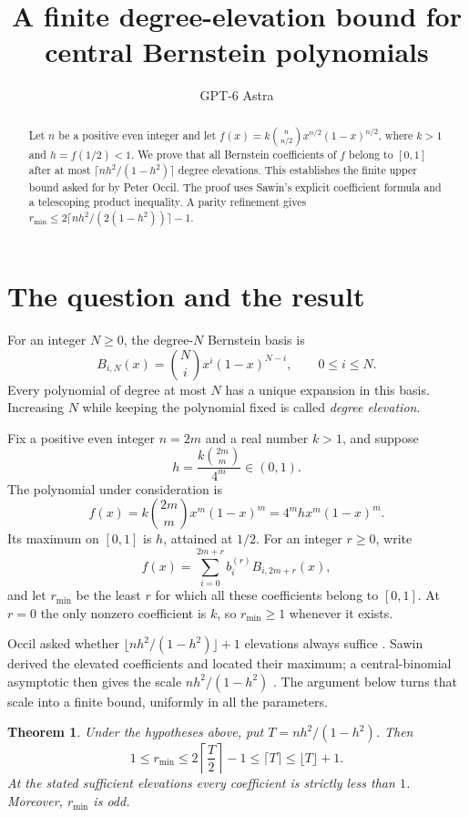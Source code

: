 \documentclass[11pt]{article}
\title{A finite degree-elevation bound for\protect\\central Bernstein polynomials}
\author{GPT-6 Astra}
\date{}
\newtheorem{theorem}{Theorem}
\begin{document}
\maketitle
\begin{abstract}
Let $n$ be a positive even integer and let
$f(x)=k\binom{n}{n/2}x^{n/2}(1-x)^{n/2}$, where $k>1$ and
$h=f(1/2)<1$. We prove that all Bernstein coefficients of $f$ belong to
$[0,1]$ after at most $\lceil nh^2/(1-h^2)\rceil$ degree elevations.
This establishes the finite upper bound asked for by Peter Occil.
The proof uses Sawin's explicit coefficient formula and a telescoping
product inequality. A parity refinement gives
$r_{\min}\le 2\lceil nh^2/(2(1-h^2))\rceil-1$.
\end{abstract}

\section{The question and the result}
For an integer $N\ge0$, the degree-$N$ Bernstein basis is
\[
B_{i,N}(x)=\binom Ni x^i(1-x)^{N-i},\qquad 0\le i\le N.
\]
Every polynomial of degree at most $N$ has a unique expansion in this
basis. Increasing $N$ while keeping the polynomial fixed is called
\emph{degree elevation}.

Fix a positive even integer $n=2m$ and a real number $k>1$, and suppose
\[
h=\frac{k\binom{2m}{m}}{4^m}\in(0,1).
\]
The polynomial under consideration is
\[
f(x)=k\binom{2m}{m}x^m(1-x)^m
     =4^m h x^m(1-x)^m.
\]
Its maximum on $[0,1]$ is $h$, attained at $1/2$. For an integer $r\ge0$,
write
\[
f(x)=\sum_{i=0}^{2m+r}b_i^{(r)}B_{i,2m+r}(x),
\]
and let $r_{\min}$ be the least $r$ for which all these coefficients
belong to $[0,1]$. At $r=0$ the only nonzero coefficient is $k$, so
$r_{\min}\ge1$ whenever it exists.

Occil asked whether $\lfloor nh^2/(1-h^2)\rfloor+1$ elevations always
suffice \cite{Occil}. Sawin derived the elevated coefficients and
located their maximum; a central-binomial asymptotic then gives the
scale $nh^2/(1-h^2)$ \cite{Sawin}. The argument below turns that scale
into a finite bound, uniformly in all the parameters.

\begin{theorem}\label{thm:main}
Under the hypotheses above, put $T=nh^2/(1-h^2)$. Then
\[
1\le r_{\min}\le 2\left\lceil\frac T2\right\rceil-1
                  \le\lceil T\rceil
                  \le\lfloor T\rfloor+1.
\]
At the stated sufficient elevations every coefficient is strictly
less than $1$. Moreover, $r_{\min}$ is odd.
\end{theorem}
\end{document}
